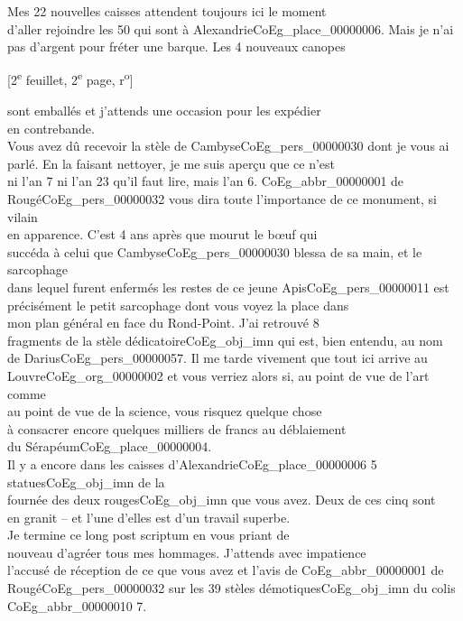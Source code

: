 \documentclass{book}
\begin{document}
\indent Mes 22 nouvelles caisses attendent toujours ici le moment\\
d’aller rejoindre les 50 qui sont à Alexandrie\gls{CoEg_place_00000006}. Mais je n’ai\\
pas d’argent pour fréter une barque. Les 4 nouveaux canopes
{\footnotesize\begin{center} {[2\textsuperscript{e} feuillet, 2\textsuperscript{e} page, r\textsuperscript{o}]}\end{center}}
\noindent sont emballés et j’attends une occasion pour les expédier\\
en contrebande.\\
\indent Vous avez dû recevoir la stèle de Cambyse\gls{CoEg_pers_00000030} dont je vous ai\\
parlé. En la faisant nettoyer, je me suis aperçu que ce n’est\\
ni l’an 7 ni l’an 23 qu’il faut lire, mais l’an 6. \gls{CoEg_abbr_00000001} de\\
Rougé\gls{CoEg_pers_00000032} vous dira toute l’importance de ce monument, si vilain\\
en apparence. C’est 4 ans après que mourut le bœuf qui\\
succéda à celui que Cambyse\gls{CoEg_pers_00000030} blessa de sa main, et le sarcophage\\
dans lequel furent enfermés les restes de ce jeune Apis\gls{CoEg_pers_00000011} est\\
précisément le petit sarcophage dont vous voyez la place dans\\
mon plan général en face du Rond-Point. J’ai retrouvé 8\\
fragments de la stèle dédicatoire\gls{CoEg_obj_imn} qui est, bien entendu, au nom\\
de Darius\gls{CoEg_pers_00000057}. Il me tarde vivement que tout ici arrive au\\
Louvre\gls{CoEg_org_00000002} et vous verriez alors si, au point de vue de l’art comme\\
au point de vue de la science, vous risquez quelque chose\\
à consacrer encore quelques milliers de francs au déblaiement\\
du Sérapéum\gls{CoEg_place_00000004}.\\
\indent Il y a encore dans les caisses d’Alexandrie\gls{CoEg_place_00000006} 5 statues\gls{CoEg_obj_imn} de la\\
fournée des deux rouges\gls{CoEg_obj_imn} que vous avez. Deux de ces cinq sont\\
en granit – et l’une d’elles est d’un travail superbe.\\
\indent Je termine ce long post scriptum en vous priant de\\
nouveau d’agréer tous mes hommages. J’attends avec impatience\\
l’accusé de réception de ce que vous avez et l’avis de \gls{CoEg_abbr_00000001} de\\
Rougé\gls{CoEg_pers_00000032} sur les 39 stèles démotiques\gls{CoEg_obj_imn} du colis \gls{CoEg_abbr_00000010} 7.
\hypertarget{CoEg_Mariette_1852-12-28}{}
\end{document}
